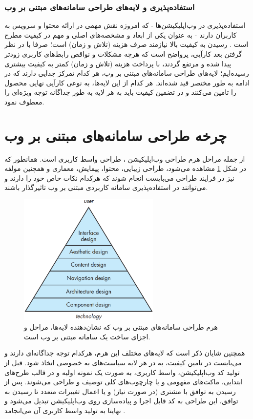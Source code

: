 \subsubsection{استفاده‌پذیری و لایه‌های طراحی سامانه‌های مبتنی بر وب}
 استفاده‌پذیری در وب‌اپلیکیشن‌ها - که امروزه نقش مهمی در ارائه محتوا و سرویس به کاربران دارند - به عنوان یکی از ابعاد و مشخصه‌های اصلی و مهم در کیفیت مطرح است
 \cite{pressman_software_2015}.
رسیدن به کیفیت بالا نیازمند صرف هزینه (تلاش و زمان) است؛ صرفا با در نظر گرفتن بعد کارآیی، پرواضح است که هرچه مشکلات و نواقص رابط‌های کاربری زودتر پیدا شده و مرتفع گردند، با پرداخت هزینه (تلاش و زمان) کمتر به کیفیت بیشتری رسیده‌ایم؛ لایه‌های طراحی سامانه‌های مبتنی بر وب، هر کدام تمرکز جدایی دارند که در ادامه به طور مختصر قید شده‌اند. هر کدام از این لایه‌ها، به نوعی کارآیی نهایی محصول را تامین می‌کنند و در تضمین کیفیت باید به هر لایه به طور جداگانه توجه ویژه‌ای را معطوف نمود.
\section{چرخه طراحی سامانه‌های مبتنی بر وب}
از جمله مراحل هرم طراحی وب‌اپلیکیشن
\cite{pressman_software_2015}،
طراحی واسط کاربری است.  همانطور که در شکل
\ref{fig:pyramid}
مشاهده می‌شود، طراحی زیبایی، محتوا، پیمایش، معماری و همچنین مولفه نیز در فرایند طراحی می‌بایست انجام شوند که هرکدام نکات خاص خود را دارند و می‌توانند در استفاده‌پذیری سامانه کاربردی مبتنی بر وب تاثیرگذار باشند.
\begin{figure}[H]
	\centering\includegraphics[width=7cm]{Resources/pyramid.PNG}
	\caption[هرم طراحی سامانه‌های مبتنی بر وب]
	{هرم طراحی سامانه‌های مبتنی بر وب
		\cite{pressman_software_2015}
		که نشان‌دهنده لایه‌ها، مراحل و اجزای ساخت یک سامانه مبتنی بر وب است.
	}
	\label{fig:pyramid}
\end{figure}
همچنین شایان ذکر است که لایه‌های مختلف این هرم، هرکدام توجه جداگانه‌ای دارند و می‌بایست در تامین کیفیت، به در هر لایه سیاست‌های به خصوصی اتخاذ شود. قبل از تولید کد وب‌اپلیکیشن، واسط کاربری، به صورت یک نمونه اولیه و در قالب طرح‌های ابتدایی، ماکت‌های مفهومی و یا چارچوب‌های کلی توصیف و طراحی می‌شوند. پس از رسیدن به توافق با مشتری (در صورت نیاز) و یا اعمال تغییرات متعدد تا رسیدن به توافق، این طراحی به کد قابل اجرا و پیاده‌سازی روی وب‌اپلیکیشن تبدیل می‌شود و نهایتا به تولید واسط کاربری آن می‌انجامد
\cite{sommerville_software_2016}.

